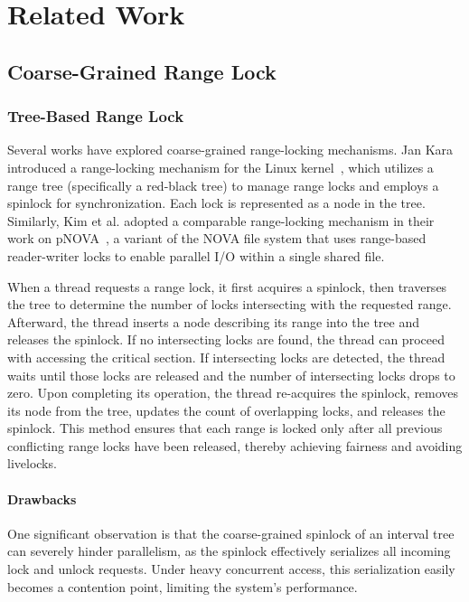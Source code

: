 \chapter{Related Work}\label{chapter:relatedwork}

\section{Coarse-Grained Range Lock}

\subsection{Tree-Based Range Lock}\label{subsec:treebased}

Several works have explored coarse-grained range-locking mechanisms. Jan Kara introduced a range-locking mechanism for the Linux kernel~\parencite{linuxRangeLockImpl2013}, which utilizes a range tree (specifically a red-black tree) to manage range locks and employs a spinlock for synchronization. Each lock is represented as a node in the tree. Similarly, Kim et al. adopted a comparable range-locking mechanism in their work on pNOVA~\parencite{kim2019pnova}, a variant of the NOVA file system that uses range-based reader-writer locks to enable parallel I/O within a single shared file.

When a thread requests a range lock, it first acquires a spinlock, then traverses the tree to determine the number of locks intersecting with the requested range. Afterward, the thread inserts a node describing its range into the tree and releases the spinlock. If no intersecting locks are found, the thread can proceed with accessing the critical section. If intersecting locks are detected, the thread waits until those locks are released and the number of intersecting locks drops to zero. Upon completing its operation, the thread re-acquires the spinlock, removes its node from the tree, updates the count of overlapping locks, and releases the spinlock. This method ensures that each range is locked only after all previous conflicting range locks have been released, thereby achieving fairness and avoiding livelocks.

\subsubsection*{Drawbacks}

One significant observation is that the coarse-grained spinlock of an interval tree can severely hinder parallelism, as the spinlock effectively serializes all incoming lock and unlock requests. Under heavy concurrent access, this serialization easily becomes a contention point, limiting the system's performance.


